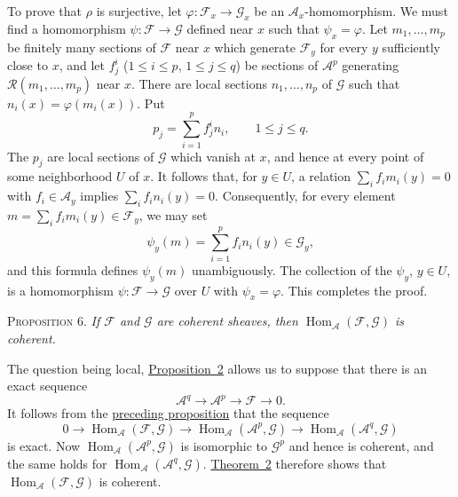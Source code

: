 To prove that $\rho$ is surjective, let $\varphi:\mathcal{F}_x\to\mathcal{G}_x$ be an $\mathcal{A}_x$-homomorphism. We must find a homomorphism $\psi:\mathcal{F}\to\mathcal{G}$ defined near $x$ such that $\psi_x=\varphi$. Let $m_1,\ldots,m_p$ be finitely many sections of $\mathcal{F}$ near $x$ which generate $\mathcal{F}_y$ for every $y$ sufficiently close to $x$, and let $f_j^i$ ($1\leq i\leq p$, $1\leq j\leq q$) be sections of $\mathcal{A}^p$ generating $\mathcal{R}(m_1,\ldots,m_p)$ near $x$. There are local sections $n_1,\ldots,n_p$ of $\mathcal{G}$ such that $n_i(x)=\varphi(m_i(x))$. Put
\[
p_j=\sum_{i=1}^{p}f_j^i n_i,\qquad 1\leq j\leq q.
\]
The $p_j$ are local sections of $\mathcal{G}$ which vanish at $x$, and hence at every point of some neighborhood $U$ of $x$. It follows that, for $y\in U$, a relation $\sum_i f_i m_i(y)=0$ with $f_i\in\mathcal{A}_y$ implies $\sum_i f_i n_i(y)=0$. Consequently, for every element $m=\sum_i f_i m_i(y)\in\mathcal{F}_y$, we may set
\[
\psi_y(m)=\sum_{i=1}^{p}f_i n_i(y)\in\mathcal{G}_y,
\]
and this formula defines $\psi_y(m)$ unambiguously. The collection of the $\psi_y$, $y\in U$, is a homomorphism $\psi:\mathcal{F}\to\mathcal{G}$ over $U$ with $\psi_x=\varphi$. This completes the proof.

\label{fac:I:2:no:14:prop:6}
\textsc{Proposition 6.} \textit{If $\mathcal{F}$ and $\mathcal{G}$ are coherent sheaves, then $\operatorname{Hom}_{\mathcal{A}}(\mathcal{F},\mathcal{G})$ is coherent.}

The question being local, \hyperref[fac:I:2:no:12:prop:2]{Proposition~2} allows us to suppose that there is an exact sequence
\[
\mathcal{A}^q\longrightarrow\mathcal{A}^p\longrightarrow\mathcal{F}\longrightarrow 0.
\]
It follows from the \hyperref[fac:I:2:no:14:prop:5]{preceding proposition} that the sequence
\[
0\longrightarrow\operatorname{Hom}_{\mathcal{A}}(\mathcal{F},\mathcal{G})
\longrightarrow\operatorname{Hom}_{\mathcal{A}}(\mathcal{A}^p,\mathcal{G})
\longrightarrow\operatorname{Hom}_{\mathcal{A}}(\mathcal{A}^q,\mathcal{G})
\]
is exact. Now $\operatorname{Hom}_{\mathcal{A}}(\mathcal{A}^p,\mathcal{G})$ is isomorphic to $\mathcal{G}^p$ and hence is coherent, and the same holds for $\operatorname{Hom}_{\mathcal{A}}(\mathcal{A}^q,\mathcal{G})$. \hyperref[fac:I:2:no:13:thm:2]{Theorem~2} therefore shows that $\operatorname{Hom}_{\mathcal{A}}(\mathcal{F},\mathcal{G})$ is coherent.
